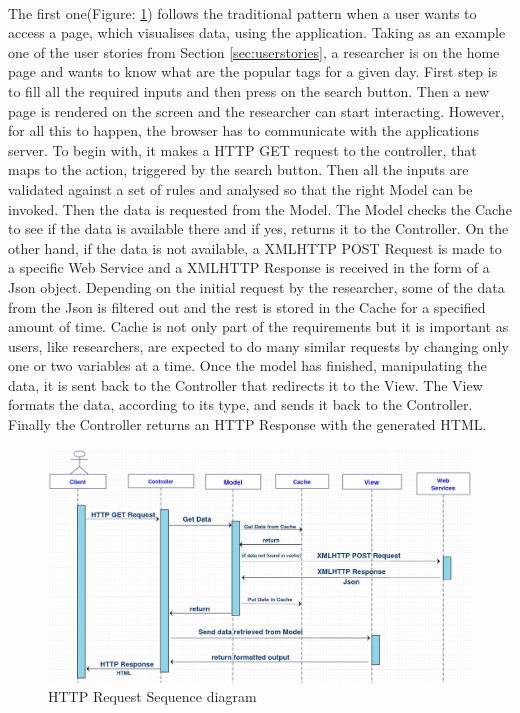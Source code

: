 \documentclass{l4proj}
\begin{document}
\paragraph{}
The first one(Figure: \ref{HTTPRequest}) follows the traditional pattern when a user wants to access a page, which visualises data, using the application. Taking as an example one of the user stories from Section \ref{sec:userstories}, a researcher is on the home page and wants to know what are the popular tags for a given day. First step is to fill all the required inputs and then press on the search button. Then a new page is rendered on the screen and the researcher can start interacting. However, for all this to happen, the browser has to communicate with the application\textquotesingle s server. To begin with, it makes a HTTP GET request to the controller, that maps to the action, triggered by the search button. Then all the inputs are validated against a set of rules and analysed so that the right Model can be invoked. Then the data is requested from the Model. The Model checks the Cache to see if the data is available there and if yes, returns it to the Controller. On the other hand, if the data is not available, a XMLHTTP POST Request is made to a specific Web Service and a XMLHTTP Response is received in the form of a Json object. Depending on the initial request by the researcher, some of the data from the Json is filtered out and the rest is stored in the Cache for a specified amount of time. Cache is not only part of the requirements but it is important as users, like researchers, are expected to do many similar requests by changing only one or two variables at a time. Once the model has finished, manipulating the data, it is sent back to the Controller that redirects it to the View. The View formats the data, according to its type, and sends it back to the Controller. Finally the Controller returns an HTTP Response with the generated HTML.  

\begin{figure}[H]
	\centering
	\includegraphics[width=\textwidth]{images/HTTPRequestSequenceDiagram}
	\caption{HTTP Request Sequence diagram}
	\label{HTTPRequest}
\end{figure}
\end{document}
